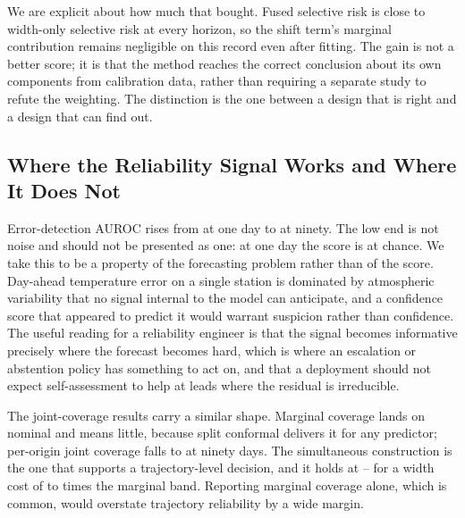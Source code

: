 We are explicit about how much that bought. Fused selective risk is close to width-only selective risk at every horizon, so the shift term's marginal contribution remains negligible on this record even after fitting. The gain is not a better score; it is that the method reaches the correct conclusion about its own components from calibration data, rather than requiring a separate study to refute the weighting. The distinction is the one between a design that is right and a design that can find out.

\subsection{Where the Reliability Signal Works and Where It Does Not}
Error-detection AUROC rises from \errorAurocOne{} at one day to \errorAurocNinety{} at ninety. The low end is not noise and should not be presented as one: at one day the score is at chance. We take this to be a property of the forecasting problem rather than of the score. Day-ahead temperature error on a single station is dominated by atmospheric variability that no signal internal to the model can anticipate, and a confidence score that appeared to predict it would warrant suspicion rather than confidence. The useful reading for a reliability engineer is that the signal becomes informative precisely where the forecast becomes hard, which is where an escalation or abstention policy has something to act on, and that a deployment should not expect self-assessment to help at leads where the residual is irreducible.

The joint-coverage results carry a similar shape. Marginal coverage lands on nominal and means little, because split conformal delivers it for any predictor; per-origin joint coverage falls to \jointCoverageNinety{} at ninety days. The simultaneous construction is the one that supports a trajectory-level decision, and it holds at \simulCoverageThirty{}--\simulCoverageNinety{} for a width cost of \widthRatioThirty{} to \widthRatioNinety{} times the marginal band. Reporting marginal coverage alone, which is common, would overstate trajectory reliability by a wide margin.

